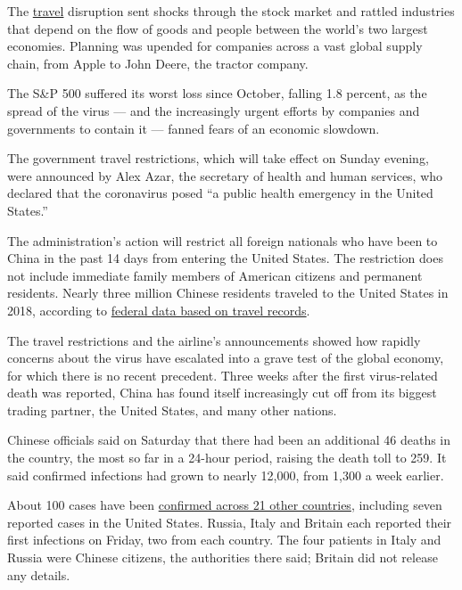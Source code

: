 The
\href{https://www.nytimes3xbfgragh.onion/2020/02/10/business/china-coronavirus-philippines-travel.html}{travel}
disruption sent shocks through the stock market and rattled industries
that depend on the flow of goods and people between the world's two
largest economies. Planning was upended for companies across a vast
global supply chain, from Apple to John Deere, the tractor company.

The S\&P 500 suffered its worst loss since October, falling 1.8 percent,
as the spread of the virus --- and the increasingly urgent efforts by
companies and governments to contain it --- fanned fears of an economic
slowdown.

The government travel restrictions, which will take effect on Sunday
evening, were announced by Alex Azar, the secretary of health and human
services, who declared that the coronavirus posed ``a public health
emergency in the United States.''

The administration's action will restrict all foreign nationals who have
been to China in the past 14 days from entering the United States. The
restriction does not include immediate family members of American
citizens and permanent residents. Nearly three million Chinese residents
traveled to the United States in 2018, according to
\href{https://travel.trade.gov/view/m-2017-I-001/index.asp}{federal data
based on travel records}.

The travel restrictions and the airline's announcements showed how
rapidly concerns about the virus have escalated into a grave test of the
global economy, for which there is no recent precedent. Three weeks
after the first virus-related death was reported, China has found itself
increasingly cut off from its biggest trading partner, the United
States, and many other nations.

Chinese officials said on Saturday that there had been an additional 46
deaths in the country, the most so far in a 24-hour period, raising the
death toll to 259. It said confirmed infections had grown to nearly
12,000, from 1,300 a week earlier.

About 100 cases have been
\href{https://www.nytimes3xbfgragh.onion/2020/02/01/nyregion/coronavirus-new-york-city.html}{confirmed
across 21 other countries}, including seven reported cases in the United
States. Russia, Italy and Britain each reported their first infections
on Friday, two from each country. The four patients in Italy and Russia
were Chinese citizens, the authorities there said; Britain did not
release any details.

